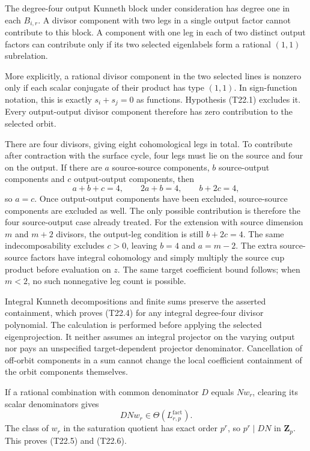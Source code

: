 The degree-four output Kunneth block under consideration has degree one in each \(B_{i,r}\). A divisor component with two legs in a single output factor cannot contribute to this block. A component with one leg in each of two distinct output factors can contribute only if its two selected eigenlabels form a rational \((1,1)\) subrelation.

More explicitly, a rational divisor component in the two selected lines is nonzero only if each scalar conjugate of their product has type \((1,1)\). In sign-function notation, this is exactly \(s_i+s_j=0\) as functions. Hypothesis (T22.1) excludes it. Every output-output divisor component therefore has zero contribution to the selected orbit.

There are four divisors, giving eight cohomological legs in total. To contribute after contraction with the surface cycle, four legs must lie on the source and four on the output. If there are \(a\) source-source components, \(b\) source-output components and \(c\) output-output components, then \[
 a+b+c=4,\qquad 2a+b=4,\qquad b+2c=4,
\] so \(a=c\). Once output-output components have been excluded, source-source components are excluded as well. The only possible contribution is therefore the four source-output case already treated. For the extension with source dimension \(m\) and \(m+2\) divisors, the output-leg condition is still \(b+2c=4\). The same indecomposability excludes \(c>0\), leaving \(b=4\) and \(a=m-2\). The extra source-source factors have integral cohomology and simply multiply the source cup product before evaluation on \(z\). The same target coefficient bound follows; when \(m<2\), no such nonnegative leg count is possible.

Integral Kunneth decompositions and finite sums preserve the asserted containment, which proves (T22.4) for any integral degree-four divisor polynomial. The calculation is performed before applying the selected eigenprojection. It neither assumes an integral projector on the varying output nor pays an unspecified target-dependent projector denominator. Cancellation of off-orbit components in a sum cannot change the local coefficient containment of the orbit components themselves.

If a rational combination with common denominator \(D\) equals \(Nw_r\), clearing its scalar denominators gives \[
 DNw_r\in\Theta(L^{\mathrm{fact}}_{r,p}).
\] The class of \(w_r\) in the saturation quotient has exact order \(p^r\), so \(p^r\mid DN\) in \(\mathbf Z_p\). This proves (T22.5) and (T22.6).

